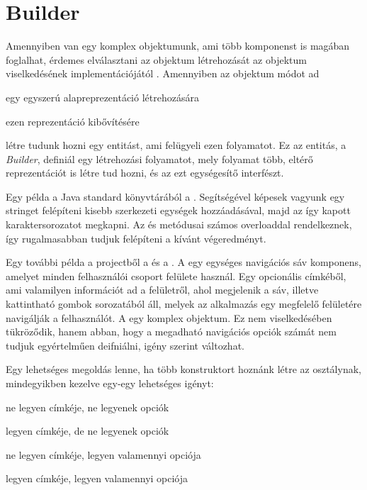 \section{Builder}

Amennyiben van egy komplex objektumunk, ami több komponenst is magában foglalhat, érdemes elválasztani az objektum létrehozását az objektum viselkedésének implementációjától \cite{gamma1995elements} . Amennyiben az objektum módot ad 

\begin{listing}
	\item egy egyszerú alapreprezentáció létrehozására
	\item ezen reprezentáció kibővítésére
\end{listing}

létre tudunk hozni egy entitást, ami felügyeli ezen folyamatot. Ez az entitás, a \emph{Builder}, definiál egy létrehozási folyamatot, mely folyamat több, eltérő reprezentációt is létre tud hozni, és az ezt egységesítő interfészt. \par

Egy példa a Java standard könyvtárából a . Segítségével képesek vagyunk egy stringet felépíteni kisebb szerkezeti egységek hozzáadásával, majd az így kapott karaktersorozatot megkapni. Az  és  metódusai számos overloaddal rendelkeznek, így rugalmasabban tudjuk felépíteni a kívánt végeredményt. \par

Egy további példa a projectből a  és a . A  egy egységes navigációs sáv komponens, amelyet minden felhasználói csoport felülete használ. Egy opcionális címkéből, ami valamilyen információt ad a felületről, ahol megjelenik a sáv, illetve kattintható gombok sorozatából áll, melyek az alkalmazás egy megfelelő felületére navigálják a felhasználót. A  egy komplex objektum. Ez nem viselkedésében tükröződik, hanem abban, hogy a megadható navigációs opciók számát nem tudjuk egyértelműen deifniálni, igény szerint változhat.\par

Egy lehetséges megoldás lenne, ha több konstruktort hoznánk létre az osztálynak, mindegyikben kezelve egy-egy lehetséges igényt: \par

\begin{listing}
	\item ne legyen címkéje, ne legyenek opciók
	\item legyen címkéje, de ne legyenek opciók
	\item ne legyen címkéje, legyen valamennyi opciója
	\item legyen címkéje, legyen valamennyi opciója
\end{listing} \par

